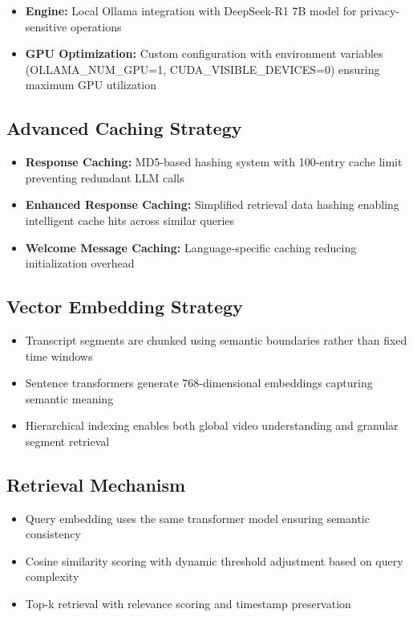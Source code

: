 \documentclass{bscs}
\begin{document}
\begin{itemize}
\item \textbf{Engine:} Local Ollama integration with DeepSeek-R1 7B model for privacy-sensitive operations
\item \textbf{GPU Optimization:} Custom configuration with environment variables (OLLAMA\_NUM\_GPU=1, CUDA\_VISIBLE\_DEVICES=0) ensuring maximum GPU utilization
\end{itemize}

\subsection{Advanced Caching Strategy}

\begin{itemize}
\item \textbf{Response Caching:} MD5-based hashing system with 100-entry cache limit preventing redundant LLM calls
\item \textbf{Enhanced Response Caching:} Simplified retrieval data hashing enabling intelligent cache hits across similar queries
\item \textbf{Welcome Message Caching:} Language-specific caching reducing initialization overhead
\end{itemize}

\subsection{Vector Embedding Strategy}

\begin{itemize}
\item Transcript segments are chunked using semantic boundaries rather than fixed time windows
\item Sentence transformers generate 768-dimensional embeddings capturing semantic meaning
\item Hierarchical indexing enables both global video understanding and granular segment retrieval
\end{itemize}

\subsection{Retrieval Mechanism}

\begin{itemize}
\item Query embedding uses the same transformer model ensuring semantic consistency
\item Cosine similarity scoring with dynamic threshold adjustment based on query complexity
\item Top-k retrieval with relevance scoring and timestamp preservation
\end{itemize}
\end{document}
